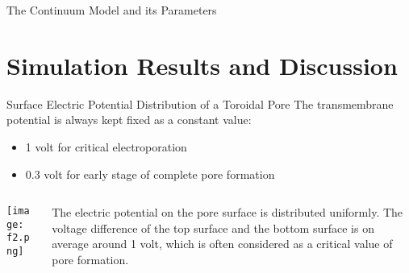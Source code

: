 \documentclass[UTF8]{ctexbeamer}
\begin{document}
\begin{frame}{The Continuum Model and its Parameters}
\end{frame}



\section{Simulation Results and Discussion}
\frame{\tableofcontents[currentsection]}
\begin{frame}{Surface Electric Potential Distribution of a Toroidal Pore}
The transmembrane potential is always kept fixed as a constant value:
	\begin{itemize}
		\item 1 volt for critical electroporation
		\item 0.3 volt for early stage of complete pore formation
	\end{itemize}
	
	\vspace{0.5cm}
	\begin{columns}
		\begin{column}{0.45\textwidth}
			\texttt{[image: f2.png]}
		\end{column}
	\begin{column}{0.45\textwidth}
		The electric potential on the pore surface is distributed uniformly. The voltage difference
		of the top surface and the bottom surface is on average around 1 volt, which is often considered as a critical value of pore formation.
	\end{column}
	\end{columns}
\end{frame}
\end{document}
